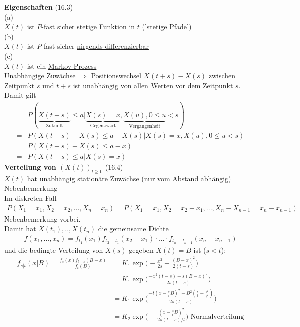 \documentclass[a4paper,openany]{book}
\theoremstyle{mytheoremstyle}
\theoremstyle{mytheoremstyle2}
\begin{document}
\noindent \textbf{Eigenschaften} (16.3)\\
(a) \\
$X(t) $ ist $P $-fast sicher \underline{stetige} Funktion in $t $ ('stetige Pfade')\\
(b)\\
$X(t) $ ist $P $-fast sicher \underline{nirgends differenzierbar}\\
(c)\\
$X(t) $ ist ein \underline{Markov-Prozess} \\
Unabhängige Zuwächse $\Rightarrow  $ Positionswechsel $X(t+s)-X(s) $ zwischen Zeitpunkt $s $ und $t+s  $ ist unabhängig von allen Werten vor dem Zeitpunkt $s  $. Damit gilt
\begin{align*}
  &P(\underbrace{X(t+s)}_{\text{Zukunft}}\leq a|\underbrace{X(s)=x}_{\text{Gegenawart}},\underbrace{X(u), 0 \leq u}_{\text{Vergangenheit}} <s) \\
   =&P(X(t+s)-X(s)\leq a-{X(s)}|{X(s)=x},{X(u),0 \leq u <s})\\
   =&P(X(t+s)-X(s)\leq a-x)\\
   =&P(X(t+s)\leq a|X(s)=x)
\end{align*}
\noindent \textbf{Verteilung von $(X(t))_{t \geq 0} $} (16.4)\\
$X(t) $ hat unabhängig stationäre Zuwächse (nur vom Abstand abhängig) \\
Nebenbemerkung \\
Im diskreten Fall
\begin{align*}
  P(X_1=x_1,X_2=x_2,...,X_n=x_n)=P(X_1=x_1,X_2=x_2-x_1,...,X_n- X _{n-1}=x_n - x _{n-1})
\end{align*}
Nebenbemerkung vorbei. \\
Damit hat $X(t_1),..,X(t_n) $ die gemeinsame Dichte
\begin{align*}
  f(x_1,...,x_n)=f _{t_1}(x_1)f _{t_2-t_1}(x_2-x_1)\cdot ... \cdot f _{t_n-t _{n-1}}(x_n-x _{n-1}) 
\end{align*}
und die bedingte Verteilung von $X(s) $ gegeben $X(t)=B $ ist ($s<t $):
\begin{align*}
  f _{s|t}(x|B)=\frac{f_s(x)f _{t-s}(B-x)}{f_t(B)}
  &=K_1\exp \bigg(-\frac{x^2}{2s}-\frac{(B-x)^2}{2(t-s)}\bigg)\\
  &=K_1\exp \bigg(\frac{-x^2(t-s)-s(B-x)^2}{2s(t-s)}\bigg)\\
  &=K_1\exp \bigg(\frac{-t(x-\frac{s}{t}B)^2-B^2(\frac{s }{t}-\frac{s^2}{t^2})}{2s(t-s)}\bigg)\\
  &=K_2\exp \bigg(-\frac{(x-\frac{s }{t}B)^2}{2s(t-s)/t}\bigg)\text{ Normalverteilung}
\end{align*}
\end{document}
